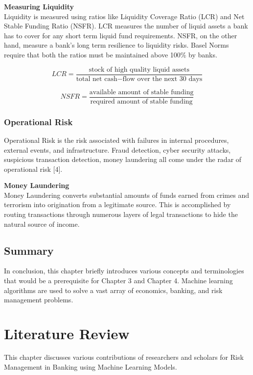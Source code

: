 \documentclass[a4paper, 12pt]{article}
\begin{document}
\vskip 0.2in
\noindent\textbf{Measuring Liquidity} \\
\noindent Liquidity is measured using ratios like Liquidity Coverage Ratio (LCR) and Net Stable Funding Ratio (NSFR). LCR measures the number of liquid assets a bank has to cover for any short term liquid fund requirements. NSFR, on the other hand, measure a bank's long term resilience to liquidity risks. Basel Norms require that both the ratios must be maintained above 100\% by banks.

\begin{equation}
    LCR = \frac{\text{stock of high quality liquid assets}}{\text{total net cash} - \text{flow over the next 30 days}}
\end{equation}

\begin{equation}
    NSFR = \frac{\text{available amount of stable funding}}{\text{required amount of stable funding}}
\end{equation}

\vskip 0.2in
\subsubsection{Operational Risk}
\noindent Operational Risk is the risk associated with failures in internal procedures, external events, and infrastructure. Fraud detection, cyber security attacks, suspicious transaction detection, money laundering all come under the radar of operational risk [4].

\vskip 0.2in
\noindent\textbf{Money Laundering} \\
\noindent Money Laundering converts substantial amounts of funds earned from crimes and terrorism into origination from a legitimate source. This is accomplished by routing transactions through numerous layers of legal transactions to hide the natural source of income.

\vskip 0.2in
\subsection{Summary}
In conclusion, this chapter briefly introduces various concepts and terminologies that would be a prerequisite for Chapter 3 and Chapter 4. Machine learning algorithms are used to solve a vast array of economics, banking, and risk management problems.

\newpage
\section{\centering Literature Review}
\vskip 0.25in
This chapter discusses various contributions of researchers and scholars for Risk Management in Banking using Machine Learning Models.
\end{document}
